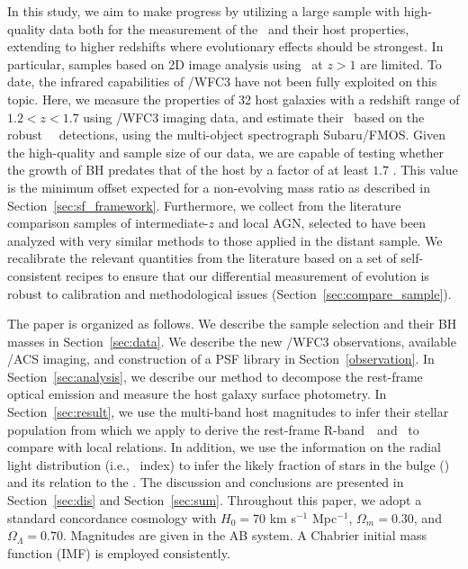 \documentclass[apj]{emulateapj}
\begin{document}
In this study, we aim to make progress by utilizing a large sample with high-quality data both for the measurement of the \mbh\ and their host properties, extending to higher redshifts where evolutionary effects should be strongest. In particular, samples based on 2D image analysis using \hst\ at $z>1$ are limited. To date, the infrared capabilities of \hst/WFC3 have not been fully exploited on this topic. Here, we measure the properties of 32 host galaxies with a redshift range of $1.2<z<1.7$ using \hst/WFC3 imaging data, and estimate their \mbh\ based on the robust \halpha\ ~detections, using the multi-object spectrograph Subaru/FMOS. Given the high-quality and sample size of our data, we are capable of testing whether the growth of BH predates that of the host by a factor of at least $1.7$ \citep[i.e., $\sim0.23$ dex,][]{Schulze2014}. This value is the minimum offset expected for a non-evolving mass ratio as described in Section~\ref{sec:sf_framework}. Furthermore, we collect from the literature comparison samples of intermediate-$z$ and local AGN, selected to have been analyzed with very similar methods to those applied in the distant sample. We recalibrate the relevant quantities from the literature based on a set of self-consistent recipes to ensure that our differential measurement of evolution is robust to calibration and methodological issues (Section~\ref{sec:compare_sample}).

The paper is organized as follows. We describe the sample selection and their BH masses in Section~\ref{sec:data}. We describe the new \hst/WFC3 observations, available \hst/ACS imaging, and construction of a PSF library in Section~\ref{observation}. In Section~\ref{sec:analysis}, we describe our method to decompose the rest-frame optical emission and measure the host galaxy surface photometry. In Section~\ref{sec:result}, we use the multi-band host magnitudes to infer their stellar population from which we apply to derive the rest-frame R-band \lhost\,~and \smass\ to compare with local relations. In addition, we use the information on the radial light distribution (i.e., \sersic\ index) to infer the likely fraction of stars in the bulge (\bmass) and its relation to the \mbh. The discussion and conclusions are presented in Section~\ref{sec:dis} and Section~\ref{sec:sum}. Throughout this paper, we adopt a standard concordance cosmology with $H_0= 70$ km s$^{-1}$ Mpc$^{-1}$, $\Omega{_m} = 0.30$, and $\Omega{_\Lambda} = 0.70$. Magnitudes are given in the AB system. A Chabrier initial mass function (IMF) is employed consistently.
\end{document}
